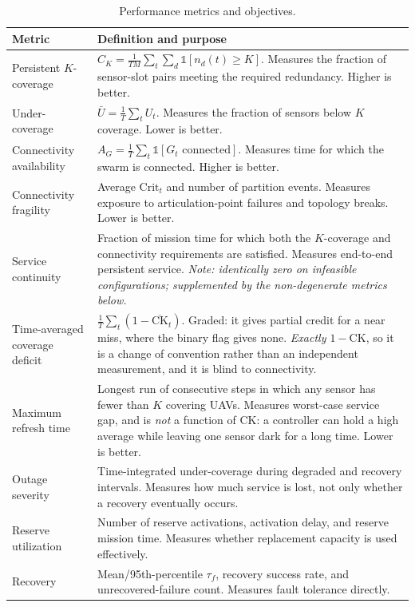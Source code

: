 \documentclass[conference]{IEEEtran}
\begin{document}
\begin{table}[t]
\caption{Performance metrics and objectives.}
\label{tab:metrics}
\centering
\scriptsize
\renewcommand{\arraystretch}{1.08}
\begin{tabularx}{\columnwidth}{@{}p{1.35cm}Y@{}}
\toprule
Metric & Definition and purpose \\
\midrule
Persistent $K$-coverage & $C_K=\frac{1}{TM}\sum_t\sum_d\mathbb 1[n_d(t)\ge K]$. Measures the fraction of sensor-slot pairs meeting the required redundancy. Higher is better. \\
Under-coverage & $\bar U=\frac{1}{T}\sum_tU_t$. Measures the fraction of sensors below $K$ coverage. Lower is better. \\
Connectivity availability & $A_G=\frac{1}{T}\sum_t\mathbb 1[G_t\text{ connected}]$. Measures time for which the swarm is connected. Higher is better. \\
Connectivity fragility & Average $\mathrm{Crit}_t$ and number of partition events. Measures exposure to articulation-point failures and topology breaks. Lower is better. \\
Service continuity & Fraction of mission time for which both the $K$-coverage and connectivity requirements are satisfied. Measures end-to-end persistent service. \emph{Note: identically zero on infeasible configurations; supplemented by the non-degenerate metrics below.} \\
Time-averaged coverage deficit & $\frac{1}{T}\sum_t(1-\overline{\mathrm{CK}}_t)$. Graded: it gives partial credit for a near miss, where the binary flag gives none. \emph{Exactly $1-\mathrm{CK}$}, so it is a change of convention rather than an independent measurement, and it is blind to connectivity. \\
Maximum refresh time & Longest run of consecutive steps in which any sensor has fewer than $K$ covering UAVs. Measures worst-case service gap, and is \emph{not} a function of $\mathrm{CK}$: a controller can hold a high average while leaving one sensor dark for a long time. Lower is better. \\
Outage severity & Time-integrated under-coverage during degraded and recovery intervals. Measures how much service is lost, not only whether a recovery eventually occurs. \\
Reserve utilization & Number of reserve activations, activation delay, and reserve mission time. Measures whether replacement capacity is used effectively. \\
Recovery & Mean/95th-percentile $\tau_f$, recovery success rate, and unrecovered-failure count. Measures fault tolerance directly. \\

\end{tabularx}
\end{table}
\end{document}
